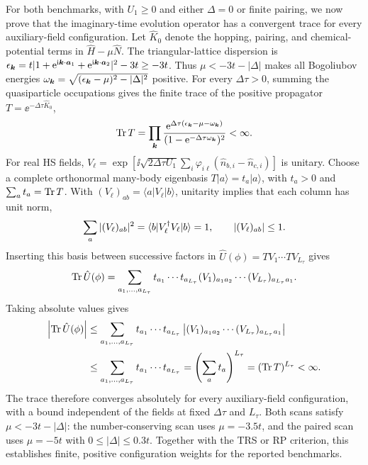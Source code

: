 For both benchmarks, with $U_1\ge0$ and either $\Delta=0$ or finite pairing, we now prove that the imaginary-time evolution operator has a convergent trace for every auxiliary-field configuration. Let $\hat K_0$ denote the hopping, pairing, and chemical-potential terms in $\hat H-\mu\hat N$. The triangular-lattice dispersion is $\epsilon_{\bm{k}}=t|1+\mathrm{e}^{\mathrm{i}\bm{k}\cdot\bm{a}_1}+\mathrm{e}^{\mathrm{i}\bm{k}\cdot\bm{a}_2}|^2-3t\ge-3t$. Thus $\mu<-3t-|\Delta|$ makes all Bogoliubov energies $\omega_{\bm{k}}=\sqrt{(\epsilon_{\bm{k}}-\mu)^2-|\Delta|^2}$ positive. For every $\Delta\tau>0$, summing the quasiparticle occupations gives the finite trace of the positive propagator $T=\ee^{-\Delta\tau\hat K_0}$,
\begin{equation}
    \operatorname{Tr} T
    =\prod_{\bm{k}}\frac{\mathrm{e}^{\Delta\tau(\epsilon_{\bm{k}}-\mu-\omega_{\bm{k}})}}
    {(1-\mathrm{e}^{-\Delta\tau\omega_{\bm{k}}})^2}<\infty.
    \label{eq:benchmark_free_partition}
\end{equation}
For real HS fields, $V_\ell=\exp[\ii\sqrt{2\Delta\tau U_1}\sum_i\varphi_{i\ell}(\hat n_{b,i}-\hat n_{c,i})]$ is unitary. Choose a complete orthonormal many-body eigenbasis $T|a\rangle=t_a|a\rangle$, with $t_a>0$ and $\sum_a t_a=\operatorname{Tr} T$. With $(V_\ell)_{ab}=\langle a|V_\ell|b\rangle$, unitarity implies that each column has unit norm,
\begin{equation}
    \sum_a |(V_\ell)_{ab}|^2
    =\langle b|V_\ell^\dagger V_\ell|b\rangle=1,
    \qquad |(V_\ell)_{ab}|\le1.
\end{equation}
Inserting this basis between successive factors in $\hat U(\phi)=TV_1\cdots TV_{L_\tau}$ gives
\begin{equation}
    \operatorname{Tr}\hat U(\phi)
    =\sum_{a_1,\ldots,a_{L_\tau}}t_{a_1}\cdots t_{a_{L_\tau}}
    (V_1)_{a_1a_2}\cdots(V_{L_\tau})_{a_{L_\tau}a_1}.
\end{equation}
Taking absolute values gives
\begin{equation}
\begin{aligned}
    \left|\operatorname{Tr}\hat U(\phi)\right|
    &\le\sum_{a_1,\ldots,a_{L_\tau}}t_{a_1}\cdots t_{a_{L_\tau}}
    \left|(V_1)_{a_1a_2}\cdots(V_{L_\tau})_{a_{L_\tau}a_1}\right|\\
    &\le\sum_{a_1,\ldots,a_{L_\tau}}t_{a_1}\cdots t_{a_{L_\tau}}
    =\left(\sum_a t_a\right)^{L_\tau}
    =(\operatorname{Tr} T)^{L_\tau}<\infty.
\end{aligned}
    \label{eq:benchmark_trace_bound}
\end{equation}
The trace therefore converges absolutely for every auxiliary-field configuration, with a bound independent of the fields at fixed $\Delta\tau$ and $L_\tau$. Both scans satisfy $\mu<-3t-|\Delta|$: the number-conserving scan uses $\mu=-3.5t$, and the paired scan uses $\mu=-5t$ with $0\le|\Delta|\le0.3t$. Together with the TRS or RP criterion, this establishes finite, positive configuration weights for the reported benchmarks.

